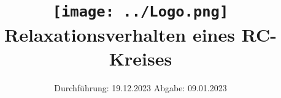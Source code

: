 

\subject{V353}
\title{\texttt{[image: ../Logo.png]}
Relaxationsverhalten eines RC-Kreises}
\date{%
  Durchführung: 19.12.2023
  \hspace{3em}
  Abgabe: 09.01.2023
}





\maketitle
\thispagestyle{empty}
\tableofcontents
\newpage






\printbibliography{}


